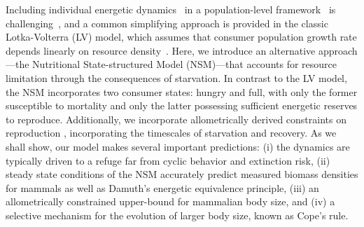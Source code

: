 \documentclass[twocolumn,preprintnumbers,amsmath,amssymb,superscriptaddress]{revtex4}
\begin{document}
Including individual energetic dynamics~\citep{Kooi2000} in a population-level framework~\citep{Kooi2000,Sousa:2010ez} is challenging~\citep{Diekmann:2010da}, and
a common simplifying approach is provided in the classic Lotka-Volterra (LV) model, which assumes that consumer population growth rate depends linearly on resource
  density~\citep{murdoch:2003}. Here, we introduce an alternative
  approach---the Nutritional State-structured Model (NSM)---that accounts for
  resource limitation through the consequences of starvation. In contrast to
  the LV model, the NSM incorporates two consumer states:
  hungry and full, with only the former susceptible to mortality and only the
  latter possessing sufficient energetic reserves to reproduce.
  Additionally, we incorporate allometrically derived constraints on reproduction \citep{Kempes:2012hy}, incorporating the timescales of starvation and recovery. 
  As we shall show, our model makes several important predictions: 
  (i) the dynamics are typically driven to a refuge far from cyclic behavior and extinction risk, 
  (ii) steady state conditions of the NSM accurately predict measured biomass densities for mammals as well as Damuth's energetic equivalence principle, 
  (iii) an allometrically constrained upper-bound for mammalian body size, and
  (iv) a selective mechanism for the evolution of larger body size, known as Cope's rule.


\end{document}
